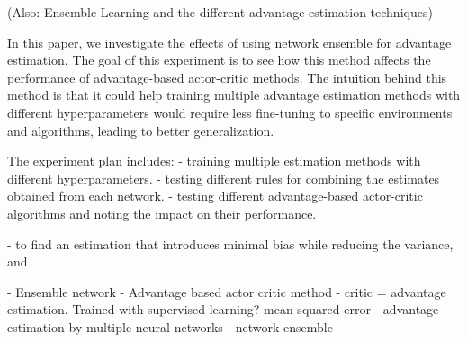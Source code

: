 (Also: Ensemble Learning and the different advantage estimation techniques)

In this paper, we investigate the effects of using network ensemble for advantage estimation. The goal of this experiment is to see how this method affects the performance of advantage-based actor-critic methods. The intuition behind this method is that it could help training multiple advantage estimation methods with different hyperparameters would require less fine-tuning to specific environments and algorithms, leading to better generalization. 


The experiment plan includes:  
- training multiple estimation methods with different hyperparameters.
- testing different rules for combining the estimates obtained from each network.
- testing different advantage-based actor-critic algorithms and noting the impact on their performance. 

- to find an estimation that introduces minimal bias while reducing the variance, and 

- Ensemble network
- Advantage based actor critic method
- critic = advantage estimation. Trained with supervised learning? mean squared error
- advantage estimation by multiple neural networks
- network ensemble 

